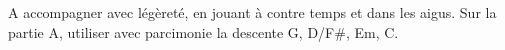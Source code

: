 A accompagner avec légèreté, en jouant à contre temps et dans les
aigus. Sur la partie A, utiliser avec parcimonie la descente G, D/F\#, Em, C.

\tune
